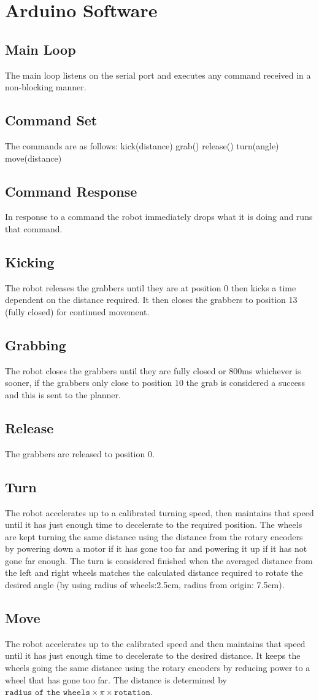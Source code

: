 
\section{Arduino Software}
\subsection{Main Loop}
The main loop listens on the serial port and executes any command received in a non-blocking manner. 
\subsection{Command Set}
The commands are as follows:
kick(distance)
grab()
release()
turn(angle)
move(distance)
\subsection{Command Response}
In response to a command the robot immediately drops what it is doing and runs that command. 
\subsection{Kicking}
The robot releases the grabbers until they are at position 0 then kicks a time dependent on the distance required. It then closes the grabbers to position 13 (fully closed) for continued movement.
\subsection{Grabbing}
The robot closes the grabbers until they are fully closed or 800ms whichever is sooner, if the grabbers only close to position 10 the grab is considered a success and this is sent to the planner. 
\subsection{Release}
The grabbers are released to position 0.
\subsection{Turn}
The robot accelerates up to a calibrated turning speed, then maintains that speed until it has just enough time to decelerate to the required position. The wheels are kept turning the same distance using the distance from the rotary encoders by powering down a motor if it has gone too far and powering it up if it has not gone far enough. The turn is considered finished when the averaged distance from the left and right wheels matches the calculated distance required to rotate the desired angle (by using radius of wheels:2.5cm, radius from origin: 7.5cm). 
\subsection{Move}
The robot accelerates up to the calibrated speed and then maintains that speed until it has just enough time to decelerate to the desired distance. It keeps the wheels going the same distance using the rotary encoders by reducing power to a wheel that has gone too far. The distance is determined by $\texttt{radius of the wheels} \times \pi \times \texttt{rotation}$. 
